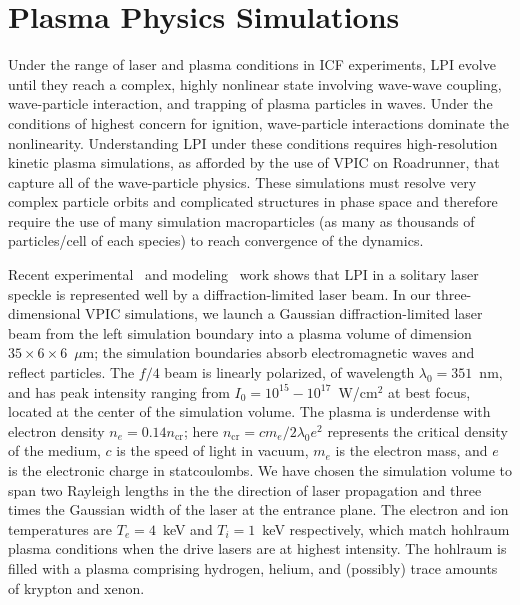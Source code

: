 \documentclass[letter,10pt]{article}
\begin{document}
%
%
\section*{Plasma Physics Simulations}

Under the range of laser and plasma conditions in ICF experiments, LPI evolve until 
they reach a complex, highly nonlinear state involving wave-wave coupling, 
wave-particle interaction, and trapping of plasma particles in waves.  Under the 
conditions of highest concern for ignition, wave-particle interactions dominate the 
nonlinearity. 
Understanding LPI under these conditions requires high-resolution kinetic plasma 
simulations, as afforded by the use of VPIC on Roadrunner, that capture all of the
wave-particle physics.  These simulations must resolve very complex particle orbits and
complicated structures in phase space and therefore require the use of many simulation 
macroparticles (as many as thousands of particles/cell of each species) to reach 
convergence of the dynamics.~\cite{}  

Recent experimental~\cite{} and modeling~\cite{} work shows that LPI
in a solitary laser speckle is represented well by a diffraction-limited laser beam.  
In our three-dimensional VPIC simulations, we launch a Gaussian diffraction-limited 
laser beam from the left simulation boundary into a plasma volume of dimension 
$35 \times 6 \times 6$~$\mu$m; the simulation boundaries absorb
electromagnetic waves and reflect particles.  
The $f/4$ beam is linearly polarized, of wavelength 
$\lambda_0 = 351$~nm,  
and has peak intensity ranging from $I_0 = 10^{15} - 10^{17}$~W/cm$^2$ at best 
focus, located at the center of the simulation volume.  The plasma is underdense 
with electron density $n_e = 0.14 n_{\mathrm{cr}}$; here 
$n_{\mathrm{cr}} = c m_e / 2 \lambda_0 e^2$ represents the critical 
density of the medium, $c$ is the speed of light in vacuum, $m_e$ is the electron
mass, and $e$ is the electronic charge in statcoulombs.  
We have chosen the simulation volume to span two Rayleigh lengths in the
the direction of laser propagation and three times the Gaussian width of the laser 
at the entrance plane.  The electron and ion temperatures are 
$T_e = 4$~keV and $T_i = 1$~keV respectively, which match hohlraum plasma conditions 
when the drive lasers are at highest intensity.  The hohlraum is filled with a plasma
comprising hydrogen, helium, and (possibly) trace amounts of krypton and xenon. 
\end{document}
